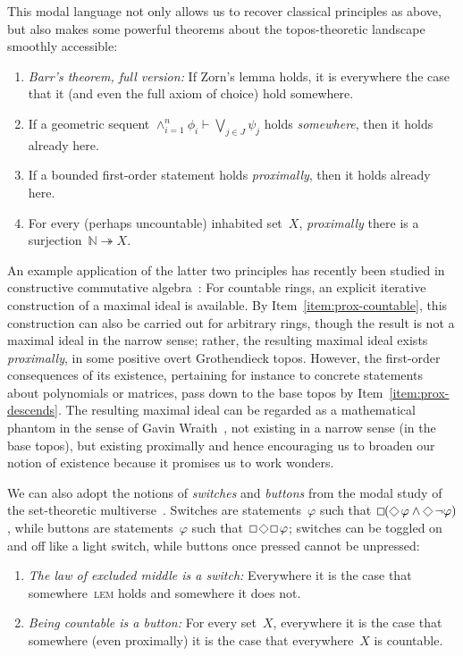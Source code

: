 \documentclass[envcountsect,envcountsame,runningheads]{llncs}
\newcommand{\NN}{\mathbb{N}}
\renewcommand{\_}{\mathpunct{.}\,}
\DeclareMathOperator{\possible}{\text{\tikz[scale=.6ex/1cm,baseline=-.6ex,rotate=45,line width=.1ex]{\draw (-1,-1) rectangle (1,1);}}}
\DeclareMathOperator{\necessary}{\text{\tikz[scale=.6ex/1cm,baseline=-.6ex,line width=.1ex]{\draw (-1,-1) rectangle (1,1);}}}
\newcommand{\?}{\,{:}\,}
\begin{document}
This modal language not only allows us to recover classical principles
as above, but also makes some powerful theorems about the topos-theoretic
landscape smoothly accessible:
\begin{enumerate}
\addtocounter{enumi}{7}
\item \emph{Barr's theorem, full version:} If Zorn's lemma holds, it is
everywhere the case that it (and even the full axiom of choice) hold somewhere.
\item If a geometric sequent $\wedge_{i=1}^n \phi_i \vdash \bigvee_{j\in J}\psi_j$ holds \emph{somewhere}, then it holds already here.
\item \label{item:prox-descends}
If a bounded first-order statement holds \emph{proximally}, then it holds already here.
\item \label{item:prox-countable}
For every (perhaps uncountable) inhabited set~$X$, \emph{proximally} there is a
surjection~$\NN \twoheadrightarrow X$.
\end{enumerate}
An example application of the latter two principles
has recently been studied in constructive
commutative algebra~\cite{blechschmidt-schuster:constructive-maximal-ideals}:
For countable rings, an explicit iterative construction of a maximal ideal is available.
By Item~\ref{item:prox-countable}, this construction can also be carried out
for arbitrary rings, though the result is not a maximal ideal in the narrow
sense; rather, the resulting maximal ideal exists \emph{proximally}, in some
positive overt Grothendieck topos. However, the first-order consequences of
its existence, pertaining for instance to concrete statements about polynomials
or matrices, pass down to the base topos by Item~\ref{item:prox-descends}.
The resulting maximal ideal can be regarded as a mathematical
phantom in the sense of Gavin Wraith~\cite{wraith:phantoms}, not existing in a narrow
sense (in the base topos), but existing proximally and hence encouraging us to broaden our notion of
existence because it promises us to work wonders.

We can also adopt the notions of \emph{switches} and \emph{buttons} from the
modal study of the set-theoretic multiverse~\cite{hamkins:modal}. Switches are
statements~$\varphi$ such that~$\necessary(\possible\varphi \wedge
\possible\neg\varphi)$, while buttons are statements~$\varphi$ such
that~$\necessary\possible\necessary\varphi$; switches can be toggled on and off
like a light switch, while buttons once pressed cannot be unpressed:
\begin{enumerate}
\addtocounter{enumi}{10}
\item \emph{The law of excluded middle is a switch:} Everywhere it is the case
that somewhere~\textsc{lem} holds and somewhere it does not.
\item \emph{Being countable is a button:} For every set~$X$, everywhere it is
the case that somewhere (even proximally) it is the case that everywhere~$X$ is
countable.
\end{enumerate}
\end{document}
